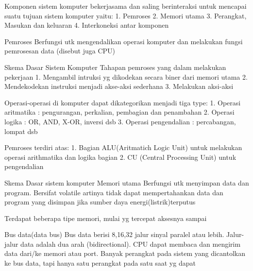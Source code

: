 Komponen sistem komputer bekerjasama dan saling berinteraksi untuk mencapai suatu tujuan sistem komputer yaitu:
1. Pemroses
2. Memori utama
3. Perangkat, Masukan dan keluaran
4. Interkoneksi antar komponen

Pemroses
Berfungsi utk mengendalikan operasi komputer dan melakukan fungsi pemrosesan data (disebut juga CPU)




Skema Dasar Sistem Komputer
Tahapan pemroses yang dalam melakukan pekerjaan
1. Mengambil intruksi yg dikodekan secara biner dari memori utama
2. Mendekodekan instruksi menjadi akse-aksi sederhana
3. Melakukan aksi-aksi

Operasi-operasi di komputer dapat dikategorikan menjadi tiga type:
1. Operasi aritmatika : pengurangan, perkalian, pembagian dan penambahan
2. Operasi logika : OR, AND, X-OR, inversi dsb
3. Operasi pengendalian : percabangan, lompat dsb

Pemroses terdiri atas:
1. Bagian ALU(Aritmatich Logic Unit) untuk melakukan operasi arithmatika dan logika bagian
2. CU (Central Processing Unit) untuk pengendalian 

Skema Dasar sistem komputer
Memori utama
Berfungsi utk menyimpan data dan program. Bersifat volatile artinya tidak dapat mempertahankan data dan program yang disimpan jika sumber daya energi(listrik)terputus

Terdapat beberapa tipe memori, mulai yg tercepat aksesnya sampai 

Bus data(data bus)
Bus data berisi 8,16,32 jalur sinyal paralel atau lebih. Jalur-jalur data adalah dua arah (bidirectional). CPU dapat membaca dan mengirim data dari/ke memori atau port. 
Banyak perangkat pada sistem yang dicantolkan ke bus data, tapi hanya satu perangkat pada satu saat yg dapat

